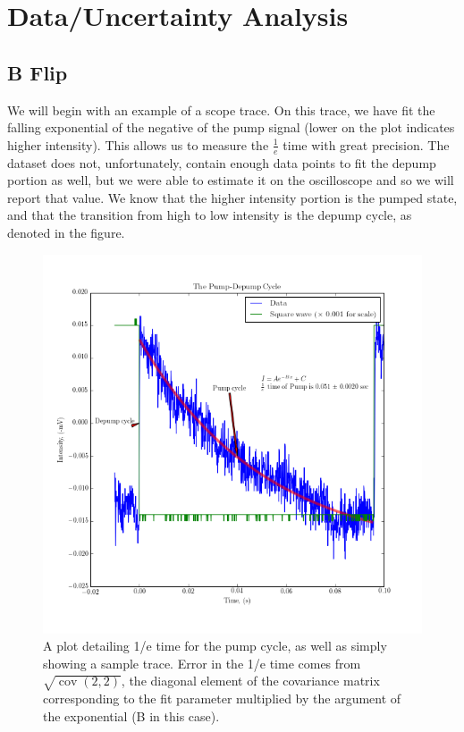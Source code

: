 \documentclass{article}
\DeclareMathOperator{\cov}{cov}
\begin{document}
\section{Data/Uncertainty Analysis}%
  \subsection{B Flip}
    We will begin with an example of a scope trace.  On this trace, we have fit the falling exponential of the negative of the pump signal (lower on the plot indicates higher intensity).  This allows us to measure the $\frac{1}{e}$ time with great precision.  The dataset does not, unfortunately, contain enough data points to fit the depump portion as well, but we were able to estimate it on the oscilloscope and so we will report that value.  We know that the higher intensity portion is the pumped state, and that the transition from high to low intensity is the depump cycle, as denoted in the figure.
    \begin{figure}[!htb]
      \centering
      \includegraphics[scale=.65]{../plots/trace_example.png}
      \caption{A plot detailing 1/e time for the pump cycle, as well as simply showing a sample trace.  Error in the 1/e time comes from $\sqrt{\cov(2,2)}$, the diagonal element of the covariance matrix corresponding to the fit parameter multiplied by the argument of the exponential (B in this case).}
    \end{figure}
\end{document}
